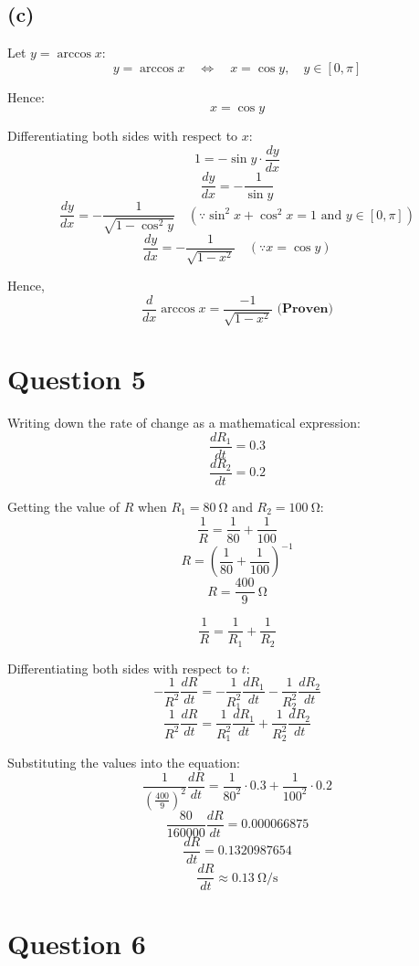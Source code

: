\documentclass[11pt]{article}
\begin{document}
\subsection{(c)}
\label{sec:org373c57c}

Let \(y = \arccos x\):
\[y = \arccos x \quad \Leftrightarrow \quad x = \cos y, \quad y \in [0, \pi]\]

Hence:
\[x = \cos y\]

Differentiating both sides with respect to \(x\):
\[1 = -\sin y \cdot \frac{dy}{dx}\]
\[\frac{dy}{dx} = -\frac{1}{\sin y}\]
\[\frac{dy}{dx} = -\frac{1}{\sqrt{1 - \cos^2 y}} \quad (\because \sin^2 x + \cos^2 x = 1 \text{ and } y \in [0, \pi])\]
\[\frac{dy}{dx} = -\frac{1}{\sqrt{1 - x^2}} \quad (\because x = \cos y)\]

Hence,
\[\frac{d}{dx} \arccos x = \frac{-1}{\sqrt{1 - x^2}} \textbf{ (Proven)}\]

\newpage

\section{Question 5}
\label{sec:org9002a9e}

Writing down the rate of change as a mathematical expression:
\[\frac{dR_1}{dt} = 0.3\]
\[\frac{dR_2}{dt} = 0.2\]

Getting the value of \(R\) when \(R_1 = \qty{80}{\unit{\ohm}}\) and \(R_2 = \qty{100}{\unit{\ohm}}\):
\[\frac{1}{R} = \frac{1}{80} + \frac{1}{100}\]
\[R = \left( \frac{1}{80} + \frac{1}{100} \right)^{-1} \]
\[R = \frac{400}{9} \ \unit{\ohm}\]

\[\frac{1}{R} = \frac{1}{R_1} + \frac{1}{R_2}\]

Differentiating both sides with respect to \(t\):
\[- \frac{1}{R^2} \frac{dR}{dt} = - \frac{1}{R_1^2} \frac{dR_1}{dt} - \frac{1}{R_2^2} \frac{dR_2}{dt}\]
\[\frac{1}{R^2} \frac{dR}{dt} = \frac{1}{R_1^2} \frac{dR_1}{dt} + \frac{1}{R_2^2} \frac{dR_2}{dt}\]

Substituting the values into the equation:
\[\frac{1}{\left( \frac{400}{9} \right)^2} \frac{dR}{dt} = \frac{1}{80^2} \cdot 0.3 + \frac{1}{100^2} \cdot 0.2\]
\[\frac{80}{160000} \frac{dR}{dt} = 0.000066875\]
\[\frac{dR}{dt} = 0.1320987654\]
\[\frac{dR}{dt} \approx \qty{0.13}{\unit{\ohm\per\second}}\]

\section{Question 6}
\label{sec:org616b73c}
\end{document}
